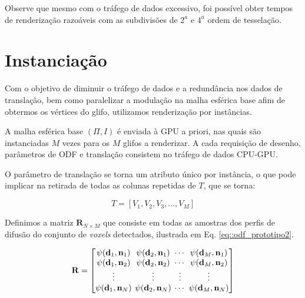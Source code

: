 \documentclass[
    12pt,                %
    oneside,            %
    a4paper,            %
    english,            %
    french,                %
    spanish,            %
    brazil                %
    ]{abntex2}
\begin{document}
Observe que mesmo com o tráfego de dados excessivo, foi possível obter tempos de renderização razoáveis com as subdivisões de $2^a$ e $4^a$ ordem de tesselação.



\section{Instanciação}
\label{sec::renderizacao_por_instancias}

Com o objetivo de diminuir o tráfego de dados e a redundância nos dados de translação, bem como paralelizar a modulação na malha esférica base afim de obtermos os vértices do glifo, utilizamos renderização por instâncias.

A malha esférica base $(\Pi, I)$ é enviada à GPU a priori, nas quais são instanciadas $M$ vezes para os $M$ glifos a renderizar. A cada requisição de desenho, parâmetros de ODF e translação consistem no tráfego de dados CPU-GPU.

O parâmetro de translação se torna um atributo único por instância, o que pode implicar na retirada de todas as colunas repetidas de $T$, que se torna:

\begin{equation}
\label{eq::vertices_prototipo2}
    T = [
    V_1,
    V_2,
    V_3, ...,
    V_M
    ]
\end{equation}

Definimos a matriz $\mathbf{R}_{N \times M}$ que consiste em todas as amostras dos perfis de difusão do conjunto de \textit{voxels} detectados, ilustrada em Eq. \ref{eq::odf_prototipo2}.

\begin{equation}
\label{eq::odf_prototipo2}
\mathbf{R} = 
\begingroup %
\setlength\arraycolsep{2pt}
\begin{bmatrix} 
    \psi(\mathbf{d}_{1}, \mathbf{n}_1) &
    \psi(\mathbf{d}_{2}, \mathbf{n}_1) & \cdots & 
    \psi(\mathbf{d}_{M}, \mathbf{n}_1)  \\
    
    \psi(\mathbf{d}_{1}, \mathbf{n}_2) &
    \psi(\mathbf{d}_{2}, \mathbf{n}_2) & \cdots & 
    \psi(\mathbf{d}_{M}, \mathbf{n}_2) \\ \vdots & \vdots & \vdots & \vdots  \\
    
    \psi(\mathbf{d}_{1}, \mathbf{n}_N) & 
    \psi(\mathbf{d}_{2}, \mathbf{n}_N) & \cdots & 
    \psi(\mathbf{d}_{M}, \mathbf{n}_N)
\end{bmatrix}
\endgroup
\end{equation}
\end{document}
